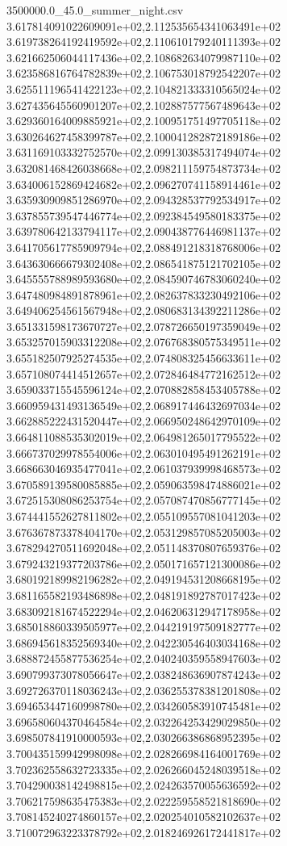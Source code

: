 \begin{filecontents*}{3500000.0_45.0_summer_night.csv}
3.617814091022609091e+02,2.112535654341063491e+02
3.619738264192419592e+02,2.110610179240111393e+02
3.621662506044117436e+02,2.108682634079987110e+02
3.623586816764782839e+02,2.106753018792542207e+02
3.625511196541422123e+02,2.104821333310565024e+02
3.627435645560901207e+02,2.102887577567489643e+02
3.629360164009885921e+02,2.100951751497705118e+02
3.630264627458399787e+02,2.100041282872189186e+02
3.631169103332752570e+02,2.099130385317494074e+02
3.632081468426038668e+02,2.098211159754873734e+02
3.634006152869424682e+02,2.096270741158914461e+02
3.635930909851286970e+02,2.094328537792534917e+02
3.637855739547446774e+02,2.092384549580183375e+02
3.639780642133794117e+02,2.090438776446981137e+02
3.641705617785909794e+02,2.088491218318768006e+02
3.643630666679302408e+02,2.086541875121702105e+02
3.645555788989593680e+02,2.084590746783060240e+02
3.647480984891878961e+02,2.082637833230492106e+02
3.649406254561567948e+02,2.080683134392211286e+02
3.651331598173670727e+02,2.078726650197359049e+02
3.653257015903312208e+02,2.076768380575349511e+02
3.655182507925274535e+02,2.074808325456633611e+02
3.657108074414512657e+02,2.072846484772162512e+02
3.659033715545596124e+02,2.070882858453405788e+02
3.660959431493136549e+02,2.068917446432697034e+02
3.662885222431520447e+02,2.066950248642970109e+02
3.664811088535302019e+02,2.064981265017795522e+02
3.666737029978554006e+02,2.063010495491262191e+02
3.668663046935477041e+02,2.061037939998468573e+02
3.670589139580085885e+02,2.059063598474886021e+02
3.672515308086253754e+02,2.057087470856777145e+02
3.674441552627811802e+02,2.055109557081041203e+02
3.676367873378404170e+02,2.053129857085205003e+02
3.678294270511692048e+02,2.051148370807659376e+02
3.679243219377203786e+02,2.050171657121300086e+02
3.680192189982196282e+02,2.049194531208668195e+02
3.681165582193486898e+02,2.048191892787017423e+02
3.683092181674522294e+02,2.046206312947178958e+02
3.685018860339505977e+02,2.044219197509182777e+02
3.686945618352569340e+02,2.042230546403034168e+02
3.688872455877536254e+02,2.040240359558947603e+02
3.690799373078056647e+02,2.038248636907874243e+02
3.692726370118036243e+02,2.036255378381201808e+02
3.694653447160998780e+02,2.034260583910745481e+02
3.696580604370464584e+02,2.032264253429029850e+02
3.698507841910000593e+02,2.030266386868952395e+02
3.700435159942998098e+02,2.028266984164001769e+02
3.702362558632723335e+02,2.026266045248039518e+02
3.704290038142498815e+02,2.024263570055636592e+02
3.706217598635475383e+02,2.022259558521818690e+02
3.708145240274860157e+02,2.020254010582102637e+02
3.710072963223378792e+02,2.018246926172441817e+02

\end{filecontents*}
